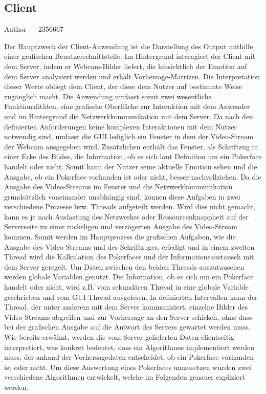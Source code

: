 \documentclass[12pt, a4paper]{report}
\makeatletter
\newcommand{\sectionauthor}[1]{%
  {\parindent0pt\vspace*{-5pt}%
  \large{Author --- }
  \linespread{1.1}\large\scshape#1%
  \par\nobreak\vspace*{35pt} }
  \@afterheading%
}
\makeatother
\begin{document}
\subsection{Client}
\sectionauthor{2356667}
Der Hauptzweck der Client-Anwendung ist die Darstellung des Output mithilfe einer grafischen Benutzerschnittstelle. Im Hintergrund interagiert der Client mit dem Server, indem er Webcam-Bilder liefert, die hinsichtlich der Emotion auf dem Server analysiert werden und erhält Vorhersage-Matrizen. Die Interpretation dieser Werte obliegt dem Client, der diese dem Nutzer auf bestimmte Weise zugänglich macht. Die Anwendung umfasst somit zwei wesentliche Funktionalitäten, eine grafische Oberfläche zur Interaktion mit dem Anwender und im Hintergrund die Netzwerkkommunikation mit dem Server. Da nach den definierten Anforderungen keine komplexen Interaktionen mit dem Nutzer notwendig sind, umfasst die GUI lediglich ein Fenster in dem der Video-Stream der Webcam ausgegeben wird. Zusätzlichen enthält das Fenster, als Schriftzug in einer Ecke des Bildes, die Information, ob es sich laut Definition um ein Pokerface handelt oder nicht. Somit kann der Nutzer seine aktuelle Emotion sehen und die Ausgabe, ob ein Pokerface vorhanden ist oder nicht, besser nachvollziehen. Da die Ausgabe des Video-Streams im Fenster und die Netzwerkkommunikation grundsätzlich voneinander unabhängig sind, können diese Aufgaben in zwei verschiedene Prozesse bzw. Threads aufgeteilt werden. Wird dies nicht gemacht, kann es je nach Auslastung des Netzwerkes oder Ressourcenknappheit auf der Serverseite zu einer ruckeligen und verzögerten Ausgabe des Video-Stream kommen. Somit werden im Hauptprozess die grafischen Aufgaben, wie die Ausgabe des Video-Streams und des Schriftzuges, erledigt und in einem zweiten Thread wird die Kalkulation des Pokerfaces und der Informationsaustausch mit dem Server geregelt. Um Daten zwischen den beiden Threads auszutauschen werden globale Variablen genutzt. Die Information, ob es sich um ein Pokerface handelt oder nicht, wird z.B. vom sekundären Thread in eine globale Variable geschrieben und vom GUI-Thread ausgelesen. In definierten Intervallen kann der Thread, der unter anderem mit dem Server kommuniziert, einzelne Bilder des Video-Streams abgreifen und zur Vorhersage an den Server schicken, ohne dass bei der grafischen Ausgabe auf die Antwort des Servers gewartet werden muss. Wie bereits erwähnt, werden die vom Server gelieferten Daten clientseitig interpretiert, was konkret bedeutet, dass ein Algorithmus implementiert werden muss, der anhand der Vorhersagedaten entscheidet, ob ein Pokerface vorhanden ist oder nicht. Um diese Auswertung eines Pokerfaces umzusetzen wurden zwei verschiedene Algorithmen entwickelt, welche im Folgenden genauer expliziert werden.
\end{document}
